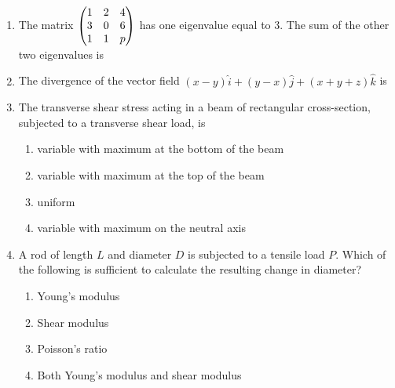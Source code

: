 \documentclass[journal,12pt,onecolumn]{IEEEtran}
\begin{document}
\begin{enumerate}
    \item The matrix $\begin{pmatrix}
                  1 & 2 & 4 \\
                  3 & 0 & 6 \\
                  1 & 1 & p\end{pmatrix}$ has one eigenvalue equal to 3. The sum of the other two eigenvalues is
          \begin{enumerate}
          \end{enumerate}

    \item The divergence of the vector field $(x-y)\hat{i} + (y-x)\hat{j} + (x+y+z)\hat{k}$ is
          \begin{enumerate}
          \end{enumerate}

    \item The transverse shear stress acting in a beam of rectangular cross-section, subjected to a transverse shear load, is
          \begin{enumerate}
              \item variable with maximum at the bottom of the beam
              \item variable with maximum at the top of the beam
              \item uniform
              \item variable with maximum on the neutral axis
          \end{enumerate}

    \item A rod of length $L$ and diameter $D$ is subjected to a tensile load $P$. Which of the following is sufficient to calculate the resulting change in diameter?
          \begin{enumerate}
              \item Young's modulus
              \item Shear modulus
              \item Poisson's ratio
              \item Both Young's modulus and shear modulus
          \end{enumerate}


\end{enumerate}
\end{document}
